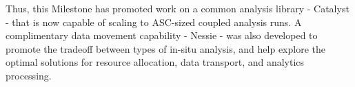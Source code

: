 Thus, this Milestone has promoted work on a common analysis library - Catalyst - that is now capable of scaling to ASC-sized coupled analysis runs.  A complimentary data movement capability - Nessie - was also developed to promote the tradeoff between types of in-situ analysis, and help explore the optimal solutions for resource allocation, data transport, and analytics processing.

